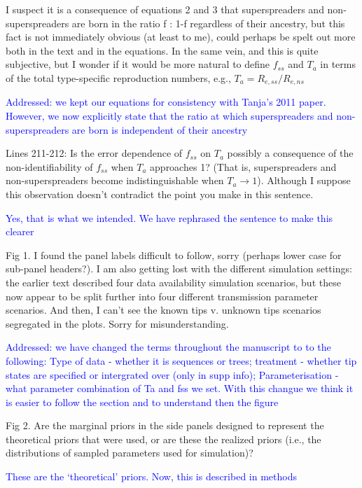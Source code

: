 \documentclass[pdflatex,sn-nature]{sn-jnl}%
\begin{document}
I suspect it is a consequence of equations 2 and 3 that superspreaders and non-superspreaders are born in the ratio f : 1-f regardless of their ancestry, but this fact is not immediately obvious (at least to me), could perhaps be spelt out more both in the text and in the equations. In the same vein, and this is quite subjective, but I wonder if it would be more natural to define $f_{ss}$ and $T_a$ in terms of the total type-specific reproduction numbers, e.g., $T_a = R_{e,ss} / R_{e,ns}$

\textcolor{blue}{Addressed: we kept our equations for consistency with Tanja's 2011 paper. However, we now explicitly state that the ratio at which superspreaders and non-superspreaders are born is independent of their ancestry}

Lines 211-212: Is the error dependence of $f_{ss}$ on $T_a$ possibly a consequence of the non-identifiability of $f_{ss}$ when $T_a$ approaches 1? (That is, superspreaders and non-superspreaders become indistinguishable when $T_a \to 1$). Although I suppose this observation doesn't contradict the point you make in this sentence.

\textcolor{blue}{Yes, that is what we intended. We have rephrased the sentence to make this clearer}

Fig 1. I found the panel labels difficult to follow, sorry (perhaps lower case for sub-panel headers?). I am also getting lost with the different simulation settings: the earlier text described four data availability simulation scenarios, but these now appear to be split further into four different transmission parameter scenarios. And then, I can't see the known tips v. unknown tips scenarios segregated in the plots. Sorry for misunderstanding.

\textcolor{blue}{Addressed: we have changed the terms throughout the manuscript to to the following: Type of data - whether it is sequences or trees; treatment - whether tip states are specified or intergrated over (only in supp info); Parameterisation - what parameter combination of Ta and fss we set. With this changue we think it is easier to follow the section and to understand then the figure}

Fig 2. Are the marginal priors in the side panels designed to represent the theoretical priors that were used, or are these the realized priors (i.e., the distributions of sampled parameters used for simulation)?

\textcolor{blue}{These are the `theoretical' priors. Now, this is described in methods}
\end{document}
